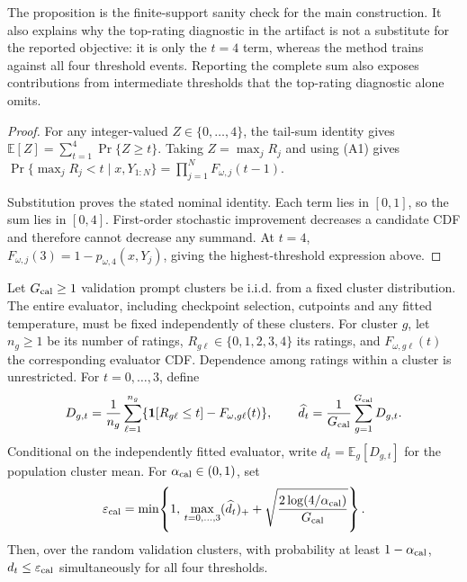 The proposition is the finite-support sanity check for the main construction.
It also explains why the top-rating diagnostic in the artifact is not a
substitute for the reported objective: it is only the \(t=4\) term, whereas the
method trains against all four threshold events.  Reporting the complete sum also exposes contributions from intermediate
thresholds that the top-rating diagnostic alone omits.

\begin{proof}
For any integer-valued \(Z\in\{0,\ldots,4\}\), the tail-sum identity gives
\(\mathbb E[Z]=\sum_{t=1}^{4}\Pr\{Z\ge t\}\).  Taking
\(Z=\max_jR_j\) and using (A1) gives
\(\Pr\{\max_jR_j<t\mid x,Y_{1:N}\}=\prod_{j=1}^{N}F_{\omega,j}(t-1)\).

Substitution proves the stated nominal identity.  Each term lies in
\([0,1]\), so the sum lies in \([0,4]\).  First-order
stochastic improvement decreases a candidate CDF and therefore cannot
decrease any summand.  At \(t=4\),
\(F_{\omega,j}(3)=1-p_{\omega,4}(x,Y_j)\), giving the highest-threshold
expression above.
\end{proof}

\begin{proposition}
\label{prop:calibration-radius}
Let \(G_{\rm cal}\ge1\) validation prompt clusters be i.i.d. from a fixed
cluster distribution. The entire evaluator, including checkpoint selection,
cutpoints and any fitted temperature, must be fixed independently of these
clusters. For cluster \(g\), let \(n_g\ge1\) be its number of ratings,
\(R_{g\ell}\in\{0,1,2,3,4\}\) its ratings, and
\(F_{\omega,g\ell}(t)\) the corresponding evaluator CDF. Dependence among
ratings within a cluster is unrestricted. For \(t=0,\ldots,3\), define
\[
D_{g,t}=\frac1{n_g}\sum_{\ell=1}^{n_g}
\{\mathbf 1[R_{g\ell}\le t]-F_{\omega,g\ell}(t)\},\qquad
\widehat d_t=\frac1{G_{\rm cal}}\sum_{g=1}^{G_{\rm cal}}D_{g,t}.
\]
Conditional on the independently fitted evaluator, write
\(d_t=\mathbb E_g[D_{g,t}]\) for the population cluster mean. For
\(\alpha_{\rm cal}\in(0,1)\), set
\begin{equation}
\label{eq:epsilon-calibration}
\varepsilon_{\rm cal}
=\min\!\left\{1,\,
\max_{t=0,\ldots,3}(\widehat d_t)_+
+\sqrt{\frac{2\log(4/\alpha_{\rm cal})}{G_{\rm cal}}}\right\}.
\end{equation}
Then, over the random validation clusters, with probability at least
\(1-\alpha_{\rm cal}\), \(d_t\le\varepsilon_{\rm cal}\) simultaneously
for all four thresholds.
\end{proposition}

